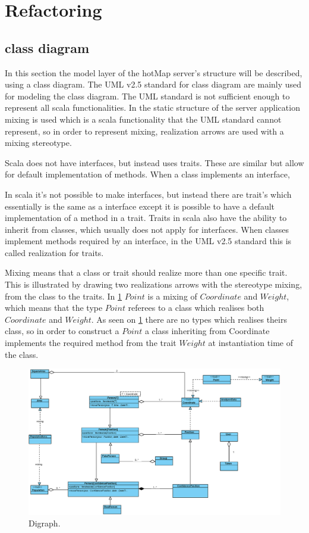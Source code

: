 \section{Refactoring} \label{sec:s4_refactoring}



\subsection{class diagram}
In this section the model layer of the hotMap server's structure will be described, using a class diagram. The UML v2.5 standard for class diagram are mainly used for modeling the class diagram. The UML standard is not sufficient enough to represent all scala functionalities. In the static structure of the server application mixing is used which is a scala functionality that the UML standard cannot represent, so in order to represent mixing, realization arrows are used with a mixing stereotype.

Scala does not have interfaces, but instead uses traits. These are similar but allow for default implementation of methods. When a class implements an interface,  


In scala it's not possible to make interfaces, but instead there are trait's which essentially is the same as a interface except it is possible to have a default implementation of a method in a trait. Traits in scala also have the ability to inherit from classes, which usually does not apply for interfaces. When classes implement methods required by an interface, in the UML v2.5 standard this is called realization for traits.

Mixing means that a class or trait should realize more than one specific trait. This is illustrated by drawing two realizations arrows with the stereotype mixing, from the class to the traits. In \cref{fig:class} $Point$ is a mixing of $Coordinate$ and $Weight$, which means that the type $Point$ referees to a class which realises both $Coordinate$ and $Weight$. As seen on \cref{fig:class} there are no types which realises theirs class, so in order to construct a $Point$ a class inheriting from Coordinate implements the required method from the trait $Weight$ at instantiation time of the class.

\begin{figure}[!htb]
\centering
\includegraphics[scale=.7]{figures/class.eps}
\caption{Digraph.}
\label{fig:class}
\end{figure}